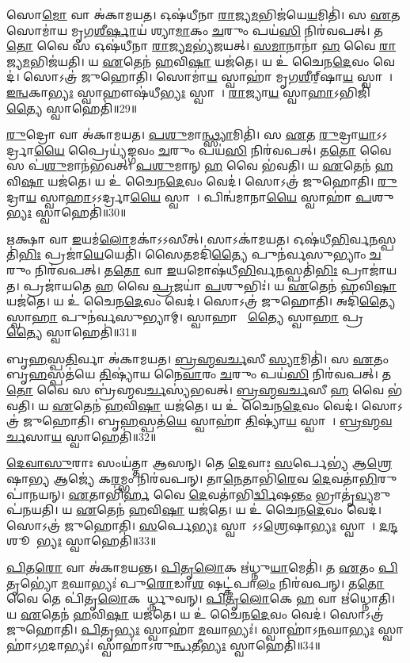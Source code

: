 𑌸𑍋\ul{𑌮𑍋} 𑌵𑌾 𑌅॑𑌕𑌾𑌮𑌯𑌤।
𑌓𑌷॑𑌧𑍀𑌨𑌾 \ul{𑌰𑌾}𑌜𑍍𑌯\ul{𑌮}𑌭𑌿𑌜॑𑌯𑍇\ul{𑌯}𑌮𑌿𑌤𑌿॑।
𑌸 \ul{𑌏}𑌤 𑌸𑍋𑌮𑌾॑𑌯 𑌮𑍃𑌗\ul{𑌶𑍀}\ul{𑌰𑍍}𑌷𑌾𑌯॑ 𑌶𑍍𑌯𑌾\ul{𑌮𑌾}𑌕𑌂 \ul{𑌚}𑌰𑍁𑌂 𑌪𑌯॑\ul{𑌸𑌿} 𑌨𑌿𑌰॑𑌵𑌪𑌤𑍍।
𑌤\ul{𑌤𑍋} 𑌵𑍈 𑌸 𑌓𑌷॑𑌧𑍀𑌨𑌾 \ul{𑌰𑌾}𑌜𑍍𑌯\ul{𑌮}𑌭𑍍𑌯॑𑌜𑌯𑌤𑍍।
\ul{𑌸}\ul{𑌮𑌾}𑌨𑌾𑌨𑌾॑ \ul{𑌹} 𑌵𑍈 \ul{𑌰𑌾}𑌜𑍍𑌯\ul{𑌮}𑌭𑌿𑌜॑𑌯𑌤𑌿।
𑌯 \ul{𑌏}𑌤𑍇𑌨॑ \ul{𑌹}𑌵𑌿\ul{𑌷𑌾} 𑌯𑌜॑𑌤𑍇।
𑌯 𑌉॑ 𑌚𑍈𑌨\ul{𑌦𑍇}𑌵𑌂 𑌵𑍇𑌦॑।
𑌸𑍋𑌽𑌤𑍍𑌰॑ 𑌜𑍁𑌹𑍋𑌤𑌿।
𑌸𑍋𑌮𑌾॑\ul{𑌯} 𑌸𑍍𑌵𑌾𑌹𑌾॑ 𑌮𑍃𑌗\ul{𑌶𑍀}𑌰𑍍‌॒\mbox{}𑌷𑌾\ul{𑌯} 𑌸𑍍𑌵𑌾𑌹𑌾᳚।
\ul{𑌇}\ul{𑌨𑍍𑌵}𑌕𑌾\ul{𑌭𑍍𑌯𑌃} 𑌸𑍍𑌵𑌾𑌹𑍗𑌷॑𑌧𑍀\ul{𑌭𑍍𑌯𑌃} 𑌸𑍍𑌵𑌾𑌹𑌾᳚।
\ul{𑌰𑌾}𑌜𑍍𑌯𑌾\ul{𑌯} 𑌸𑍍𑌵𑌾\ul{𑌹𑌾}\-𑌽𑌭𑌿𑌜𑌿॑\ul{𑌤𑍍𑌯𑍈} 𑌸𑍍𑌵𑌾𑌹𑍇𑌤𑌿॑॥29॥

\ul{𑌰𑍁}𑌦𑍍𑌰𑍋 𑌵𑌾 𑌅॑𑌕𑌾𑌮𑌯𑌤।
\ul{𑌪}\ul{𑌶𑍁}𑌮𑌾\ul{𑌨𑍍𑌥𑍍𑌸𑍍𑌯𑌾}𑌮𑌿𑌤𑌿॑।
𑌸 \ul{𑌏}𑌤 \ul{𑌰𑍁}𑌦𑍍𑌰𑌾\ul{𑌯𑌾}𑌽𑌽𑌰𑍍𑌦𑍍𑌰𑌾\ul{𑌯𑍈} 𑌪𑍍𑌰𑍈𑌯𑍍𑌯॑𑌙𑍍𑌗𑌵𑌂 \ul{𑌚}𑌰𑍁𑌂 𑌪𑌯॑\ul{𑌸𑌿} 𑌨𑌿𑌰॑𑌵𑌪𑌤𑍍।
𑌤\ul{𑌤𑍋} 𑌵𑍈 𑌸 𑌪॑\ul{𑌶𑍁}𑌮𑌾𑌨॑𑌭𑌵𑌤𑍍।
\ul{𑌪}\ul{𑌶𑍁}𑌮𑌾𑌨𑍍 \ul{𑌹} 𑌵𑍈 𑌭॑𑌵𑌤𑌿।
𑌯 \ul{𑌏}𑌤𑍇𑌨॑ \ul{𑌹}𑌵𑌿\ul{𑌷𑌾} 𑌯𑌜॑𑌤𑍇।
𑌯 𑌉॑ 𑌚𑍈𑌨\ul{𑌦𑍇}𑌵𑌂 𑌵𑍇𑌦॑।
𑌸𑍋𑌽𑌤𑍍𑌰॑ 𑌜𑍁𑌹𑍋𑌤𑌿।
\ul{𑌰𑍁}𑌦𑍍𑌰𑌾\ul{𑌯} 𑌸𑍍𑌵𑌾\ul{𑌹𑌾}\-𑌽𑌽𑌰𑍍𑌦𑍍𑌰𑌾\ul{𑌯𑍈} 𑌸𑍍𑌵𑌾𑌹𑌾᳚।
𑌪𑌿𑌨𑍍𑌵॑𑌮𑌾𑌨𑌾\ul{𑌯𑍈} 𑌸𑍍𑌵𑌾𑌹𑌾॑ \ul{𑌪}𑌶𑍁\ul{𑌭𑍍𑌯𑌃} 𑌸𑍍𑌵𑌾𑌹𑍇𑌤𑌿॑॥30॥

\ul{𑌋}𑌕𑍍𑌷𑌾 𑌵𑌾 \ul{𑌇}𑌯𑌮॑\ul{𑌲𑍋}𑌮𑌕𑌾॑\-𑌽𑌽𑌸𑍀𑌤𑍍।
𑌸𑌾𑌽𑌕𑌾॑𑌮𑌯𑌤।
𑌓𑌷॑𑌧𑍀\ul{𑌭𑌿}𑌰𑍍𑌵\ul{𑌨}𑌸𑍍𑌪𑌤𑌿॑\ul{𑌭𑌿𑌃} 𑌪𑍍𑌰𑌜𑌾॑\ul{𑌯𑍇}𑌯𑍇𑌤𑌿॑।
𑌸𑍈𑌤𑌮𑌦𑌿॑\ul{𑌤𑍍𑌯𑍈} 𑌪𑍁𑌨॑𑌰𑍍𑌵𑌸𑍁𑌭𑍍𑌯𑌾𑌂 \ul{𑌚}𑌰𑍁𑌂 𑌨𑌿𑌰॑𑌵𑌪𑌤𑍍।
𑌤\ul{𑌤𑍋} 𑌵𑌾 \ul{𑌇}𑌯𑌮𑍋𑌷॑𑌧𑍀\ul{𑌭𑌿}𑌰𑍍𑌵\ul{𑌨}𑌸𑍍𑌪𑌤𑌿॑\ul{𑌭𑌿𑌃} 𑌪𑍍𑌰𑌾𑌜𑌾॑𑌯𑌤।
𑌪𑍍𑌰𑌜𑌾॑𑌯𑌤𑍇 \ul{𑌹} 𑌵𑍈 \ul{𑌪𑍍𑌰}𑌜𑌯𑌾॑ \ul{𑌪}𑌶𑍁𑌭𑌿𑌃॑।
𑌯 \ul{𑌏}𑌤𑍇𑌨॑ \ul{𑌹}𑌵𑌿\ul{𑌷𑌾} 𑌯𑌜॑𑌤𑍇।
𑌯 𑌉॑ 𑌚𑍈𑌨\ul{𑌦𑍇}𑌵𑌂 𑌵𑍇𑌦॑।
𑌸𑍋𑌽𑌤𑍍𑌰॑ 𑌜𑍁𑌹𑍋𑌤𑌿।
𑌅𑌦𑌿॑\ul{𑌤𑍍𑌯𑍈} 𑌸𑍍𑌵𑌾\ul{𑌹𑌾} 𑌪𑍁𑌨॑𑌰𑍍𑌵𑌸𑍁𑌭𑍍𑌯𑌾𑌮𑍍।
𑌸𑍍𑌵𑌾𑌹𑌾 𑌭𑍂᳚\ul{𑌤𑍍𑌯𑍈} 𑌸𑍍𑌵𑌾\ul{𑌹𑌾} 𑌪𑍍𑌰𑌜𑌾᳚\ul{𑌤𑍍𑌯𑍈} 𑌸𑍍𑌵𑌾𑌹𑍇𑌤𑌿॑॥31॥

𑌬𑍃\ul{𑌹}𑌸𑍍𑌪\ul{𑌤𑌿}𑌰𑍍𑌵𑌾 𑌅॑𑌕𑌾𑌮𑌯𑌤।
\ul{𑌬𑍍𑌰}\ul{𑌹𑍍𑌮}\ul{𑌵}\ul{𑌰𑍍𑌚}𑌸𑍀 \ul{𑌸𑍍𑌯𑌾}𑌮𑌿𑌤𑌿॑।
𑌸 \ul{𑌏}𑌤𑌂 𑌬𑍃\ul{𑌹}𑌸𑍍𑌪𑌤॑𑌯𑍇 \ul{𑌤𑌿}𑌷𑍍𑌯𑌾॑𑌯 𑌨𑍈\ul{𑌵𑌾}𑌰𑌂 \ul{𑌚}𑌰𑍁𑌂 𑌪𑌯॑\ul{𑌸𑌿} 𑌨𑌿𑌰॑𑌵𑌪𑌤𑍍।
𑌤\ul{𑌤𑍋} 𑌵𑍈 𑌸 𑌬𑍍𑌰॑𑌹𑍍𑌮𑌵\ul{𑌰𑍍𑌚}𑌸𑍍𑌯॑𑌭𑌵𑌤𑍍।
\ul{𑌬𑍍𑌰}\ul{𑌹𑍍𑌮}\ul{𑌵}\ul{𑌰𑍍𑌚}𑌸𑍀 \ul{𑌹} 𑌵𑍈 𑌭॑𑌵𑌤𑌿।
𑌯 \ul{𑌏}𑌤𑍇𑌨॑ \ul{𑌹}𑌵𑌿\ul{𑌷𑌾} 𑌯𑌜॑𑌤𑍇।
𑌯 𑌉॑ 𑌚𑍈𑌨\ul{𑌦𑍇}𑌵𑌂 𑌵𑍇𑌦॑।
𑌸𑍋𑌽𑌤𑍍𑌰॑ 𑌜𑍁𑌹𑍋𑌤𑌿।
𑌬𑍃\ul{𑌹}𑌸𑍍𑌪𑌤॑\ul{𑌯𑍇} 𑌸𑍍𑌵𑌾𑌹𑌾॑ \ul{𑌤𑌿}𑌷𑍍𑌯𑌾॑\ul{𑌯} 𑌸𑍍𑌵𑌾𑌹𑌾᳚।
\ul{𑌬𑍍𑌰}\ul{𑌹𑍍𑌮}\ul{𑌵}\ul{𑌰𑍍𑌚}𑌸𑌾\ul{𑌯} 𑌸𑍍𑌵𑌾𑌹𑍇𑌤𑌿॑॥32॥

\ul{𑌦𑍇}\ul{𑌵𑌾}\ul{𑌸𑍁}𑌰𑌾𑌃 𑌸𑌂𑌯॑𑌤𑍍𑌤𑌾 𑌆𑌸𑌨𑍍।
𑌤𑍇 \ul{𑌦𑍇}𑌵𑌾𑌃 \ul{𑌸}𑌰𑍍𑌪𑍇𑌭𑍍𑌯॑ 𑌆\ul{𑌶𑍍𑌰𑍇}𑌷𑌾\ul{𑌭𑍍𑌯} 𑌆𑌜𑍍𑌯𑍇॑ 𑌕\ul{𑌰}𑌮𑍍𑌭𑌂 𑌨𑌿𑌰॑𑌵𑌪𑌨𑍍।
𑌤𑌾\ul{𑌨𑍇}𑌤𑌾𑌭𑌿॑\ul{𑌰𑍇}𑌵 \ul{𑌦𑍇}𑌵𑌤𑌾॑\ul{𑌭𑌿}𑌰𑍁𑌪𑌾॑𑌨𑌯𑌨𑍍।
\ul{𑌏}𑌤𑌾𑌭𑌿॑\ul{𑌰𑍍𑌹} 𑌵𑍈 \ul{𑌦𑍇}𑌵𑌤𑌾॑𑌭𑌿\ul{𑌰𑍍𑌦𑍍𑌵𑌿}𑌷\ul{𑌨𑍍𑌤𑌂} 𑌭𑍍𑌰𑌾𑌤𑍃॑\ul{𑌵𑍍𑌯}𑌮𑍁𑌪॑𑌨𑌯𑌤𑌿।
𑌯 \ul{𑌏}𑌤𑍇𑌨॑ \ul{𑌹}𑌵𑌿\ul{𑌷𑌾} 𑌯𑌜॑𑌤𑍇।
𑌯 𑌉॑ 𑌚𑍈𑌨\ul{𑌦𑍇}𑌵𑌂 𑌵𑍇𑌦॑।
𑌸𑍋𑌽𑌤𑍍𑌰॑ 𑌜𑍁𑌹𑍋𑌤𑌿।
\ul{𑌸}𑌰𑍍𑌪𑍇\ul{𑌭𑍍𑌯𑌃} 𑌸𑍍𑌵𑌾𑌹𑌾᳚\-𑌽𑌽\ul{𑌶𑍍𑌰𑍇}𑌷𑌾\ul{𑌭𑍍𑌯𑌃} 𑌸𑍍𑌵𑌾𑌹𑌾᳚।
\ul{𑌦}\ul{𑌨𑍍𑌦}𑌶𑍂𑌕𑍇᳚\ul{𑌭𑍍𑌯𑌃} 𑌸𑍍𑌵𑌾𑌹𑍇𑌤𑌿॑॥33॥

\ul{𑌪𑌿}𑌤\ul{𑌰𑍋} 𑌵𑌾 𑌅॑𑌕𑌾𑌮𑌯𑌨𑍍𑌤।
\ul{𑌪𑌿}\ul{𑌤𑍃}\ul{𑌲𑍋}𑌕 𑌋॑𑌧𑍍𑌨𑍁\ul{𑌯𑌾}𑌮𑍇𑌤𑌿॑।
𑌤 \ul{𑌏}𑌤𑌂 \ul{𑌪𑌿}𑌤𑍃𑌭𑍍𑌯𑍋॑ \ul{𑌮}𑌘𑌾𑌭𑍍𑌯𑌃॑ 𑌪𑍁\ul{𑌰𑍋}𑌡𑌾\ul{𑌶}\ul{} 𑌷𑌟𑍍𑌕॑𑌪𑌾\ul{𑌲𑌂} 𑌨𑌿𑌰॑𑌵𑌪𑌨𑍍।
𑌤\ul{𑌤𑍋} 𑌵𑍈 𑌤𑍇 𑌪𑌿॑𑌤𑍃\ul{𑌲𑍋}𑌕 𑌆᳚𑌰𑍍𑌧𑍍𑌨𑍁𑌵𑌨𑍍।
\ul{𑌪𑌿}\ul{𑌤𑍃}\ul{𑌲𑍋}𑌕𑍇 \ul{𑌹} 𑌵𑌾 𑌋॑𑌧𑍍𑌨𑍋𑌤𑌿।
𑌯 \ul{𑌏}𑌤𑍇𑌨॑ \ul{𑌹}𑌵𑌿\ul{𑌷𑌾} 𑌯𑌜॑𑌤𑍇।
𑌯 𑌉॑ 𑌚𑍈𑌨\ul{𑌦𑍇}𑌵𑌂 𑌵𑍇𑌦॑।
𑌸𑍋𑌽𑌤𑍍𑌰॑ 𑌜𑍁𑌹𑍋𑌤𑌿।
\ul{𑌪𑌿}𑌤𑍃\ul{𑌭𑍍𑌯𑌃} 𑌸𑍍𑌵𑌾𑌹𑌾॑ \ul{𑌮}𑌘𑌾𑌭𑍍𑌯𑌃॑।
𑌸𑍍𑌵𑌾𑌹𑌾॑\-𑌽\ul{𑌨}𑌘𑌾\ul{𑌭𑍍𑌯𑌃} 𑌸𑍍𑌵𑌾𑌹𑌾॑𑌽\ul{𑌗}𑌦𑌾𑌭𑍍𑌯𑌃॑।
𑌸𑍍𑌵𑌾𑌹𑌾॑\-𑌽𑌰𑍁\ul{𑌨𑍍𑌧}𑌤𑍀\ul{𑌭𑍍𑌯𑌃} 𑌸𑍍𑌵𑌾𑌹𑍇𑌤𑌿॑॥34॥

